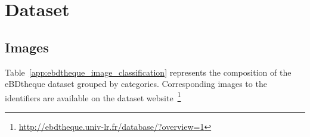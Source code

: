 \chapter{Dataset}
\label{app:dataset}
\graphicspath{{./chapters/Appendix/figs/}}

\section*{Images}

Table~\ref{app:ebdtheque_image_classification} represents the composition of the eBDtheque dataset grouped by categories. 
Corresponding images to the identifiers are available on the dataset website~\footnote{\url{http://ebdtheque.univ-lr.fr/database/?overview=1}}


